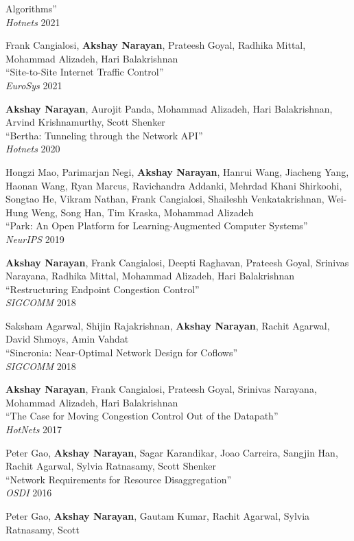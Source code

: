 \documentclass{article}
\newcommand{\identity}[1]{#1}
\begin{document}
Algorithms{''}\identity{\\}\identity{\emph{Hotnets}}\identity{ }\identity{2021}\identity{\item}Frank Cangialosi, \identity{\textbf{Akshay Narayan}}, Prateesh Goyal, Radhika Mittal, Mohammad Alizadeh, Hari Balakrishnan\identity{\\}{``}Site{-}to{-}Site Internet Traffic Control{''}\identity{\\}\identity{\emph{EuroSys}}\identity{ }\identity{2021}\identity{\item}\identity{\textbf{Akshay Narayan}}, Aurojit Panda, Mohammad Alizadeh, Hari Balakrishnan, Arvind Krishnamurthy, Scott Shenker\identity{\\}{``}Bertha: Tunneling through the Network API{''}\identity{\\}\identity{\emph{Hotnets}}\identity{ }\identity{2020}\identity{\item}Hongzi Mao, Parimarjan Negi, \identity{\textbf{Akshay Narayan}}, Hanrui Wang, Jiacheng Yang, Haonan Wang, Ryan Marcus, Ravichandra Addanki, Mehrdad Khani Shirkoohi, Songtao He, Vikram Nathan, Frank Cangialosi, Shaileshh Venkatakrishnan, Wei{-}Hung Weng, Song Han, Tim Kraska, Mohammad Alizadeh\identity{\\}{``}Park: An Open Platform for Learning{-}Augmented Computer Systems{''}\identity{\\}\identity{\emph{NeurIPS}}\identity{ }\identity{2019}\identity{\item}\identity{\textbf{Akshay Narayan}}, Frank Cangialosi, Deepti Raghavan, Prateesh Goyal, Srinivas Narayana, Radhika Mittal, Mohammad Alizadeh, Hari Balakrishnan\identity{\\}{``}Restructuring Endpoint Congestion Control{''}\identity{\\}\identity{\emph{SIGCOMM}}\identity{ }\identity{2018}\identity{\item}Saksham Agarwal, Shijin Rajakrishnan, \identity{\textbf{Akshay Narayan}}, Rachit Agarwal, David Shmoys, Amin Vahdat\identity{\\}{``}Sincronia: Near{-}Optimal Network Design for Coflows{''}\identity{\\}\identity{\emph{SIGCOMM}}\identity{ }\identity{2018}\identity{\item}\identity{\textbf{Akshay Narayan}}, Frank Cangialosi, Prateesh Goyal, Srinivas Narayana, Mohammad Alizadeh, Hari Balakrishnan\identity{\\}{``}The Case for Moving Congestion Control Out of the Datapath{''}\identity{\\}\identity{\emph{HotNets}}\identity{ }\identity{2017}\identity{\item}Peter Gao, \identity{\textbf{Akshay Narayan}}, Sagar Karandikar, Joao Carreira, Sangjin Han, Rachit Agarwal, Sylvia Ratnasamy, Scott Shenker\identity{\\}{``}Network Requirements for Resource Disaggregation{''}\identity{\\}\identity{\emph{OSDI}}\identity{ }\identity{2016}\identity{\item}Peter Gao, \identity{\textbf{Akshay Narayan}}, Gautam Kumar, Rachit Agarwal, Sylvia Ratnasamy, Scott 
\end{document}
